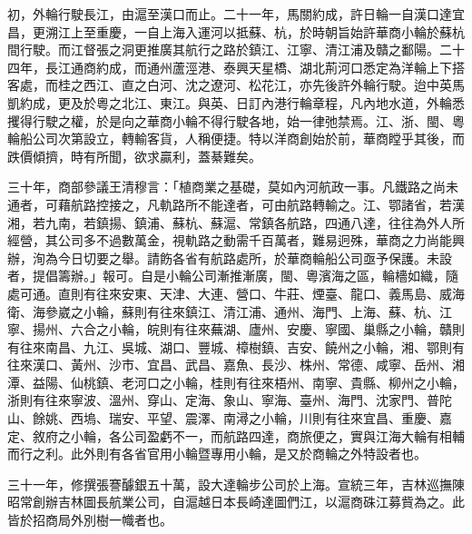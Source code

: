 \begin{pinyinscope}
初，外輪行駛長江，由滬至漢口而止。二十一年，馬關約成，許日輪一自漢口達宜昌，更溯江上至重慶，一自上海入運河以抵蘇、杭，於時朝旨始許華商小輪於蘇杭間行駛。而江督張之洞更推廣其航行之路於鎮江、江寧、清江浦及贛之鄱陽。二十四年，長江通商約成，而通州蘆涇港、泰興天星橋、湖北荊河口悉定為洋輪上下搭客處，而桂之西江、直之白河、沈之遼河、松花江，亦先後許外輪行駛。迨中英馬凱約成，更及於粵之北江、東江。與英、日訂內港行輪章程，凡內地水道，外輪悉攫得行駛之權，於是向之華商小輪不得行駛各地，始一律弛禁焉。江、浙、閩、粵輪船公司次第設立，轉輸客貨，人稱便捷。特以洋商創始於前，華商瞠乎其後，而跌價傾擠，時有所聞，欲求贏利，蓋綦難矣。

三十年，商部參議王清穆言：「植商業之基礎，莫如內河航政一事。凡鐵路之尚未通者，可藉航路控接之，凡軌路所不能達者，可由航路轉輸之。江、鄂諸省，若漢湘，若九南，若鎮揚、鎮浦、蘇杭、蘇滬、常鎮各航路，四通八達，往往為外人所經營，其公司多不過數萬金，視軌路之動需千百萬者，難易迥殊，華商之力尚能興辦，洵為今日切要之舉。請飭各省有航路處所，於華商輪船公司亟予保護。未設者，提倡籌辦。」報可。自是小輪公司漸推漸廣，閩、粵濱海之區，輪檣如織，隨處可通。直則有往來安東、天津、大連、營口、牛莊、煙臺、龍口、義馬島、威海衛、海參崴之小輪，蘇則有往來鎮江、清江浦、通州、海門、上海、蘇、杭、江寧、揚州、六合之小輪，皖則有往來蕪湖、廬州、安慶、寧國、巢縣之小輪，贛則有往來南昌、九江、吳城、湖口、豐城、樟樹鎮、吉安、饒州之小輪，湘、鄂則有往來漢口、黃州、沙市、宜昌、武昌、嘉魚、長沙、株州、常德、咸寧、岳州、湘潭、益陽、仙桃鎮、老河口之小輪，桂則有往來梧州、南寧、貴縣、柳州之小輪，浙則有往來寧波、溫州、穿山、定海、象山、寧海、臺州、海門、沈家門、普陀山、餘姚、西塢、瑞安、平望、震澤、南潯之小輪，川則有往來宜昌、重慶、嘉定、敘府之小輪，各公司盈虧不一，而航路四達，商旅便之，實與江海大輪有相輔而行之利。此外則有各省官用小輪暨專用小輪，是又於商輪之外特設者也。

三十一年，修撰張謇醵銀五十萬，設大達輪步公司於上海。宣統三年，吉林巡撫陳昭常創辦吉林圖長航業公司，自滬越日本長崎達圖們江，以滬商硃江募貲為之。此皆於招商局外別樹一幟者也。


\end{pinyinscope}